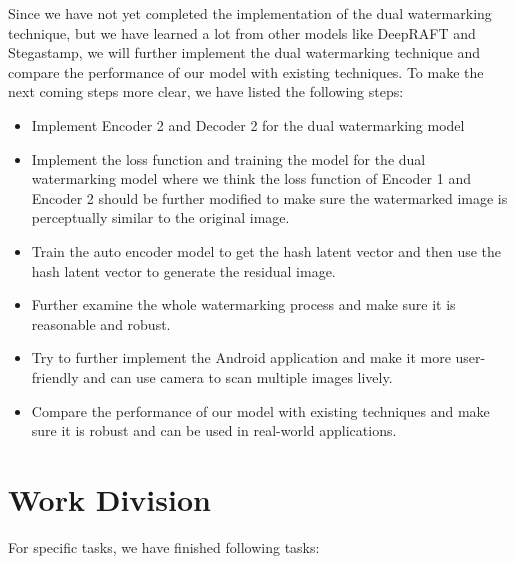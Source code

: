 \documentclass[acmsmall, nonacm]{acmart}
\begin{document}

Since we have not yet completed the implementation of the dual watermarking technique, but we have learned a lot from other models like DeepRAFT and Stegastamp, we will further implement the dual watermarking technique and compare the performance of our model with existing techniques.
To make the next coming steps more clear, we have listed the following steps:

\begin{itemize}
  \item Implement Encoder 2 and Decoder 2 for the dual watermarking model
  \item Implement the loss function and training the model for the dual watermarking model where we think the loss function of Encoder 1 and Encoder 2 should be further modified to make sure the watermarked image is perceptually similar to the original image.
  \item Train the auto encoder model to get the hash latent vector and then use the hash latent vector to generate the residual image.
  \item Further examine the whole watermarking process and make sure it is reasonable and robust.
  \item Try to further implement the Android application and make it more user-friendly and can use camera to scan multiple images lively.
  \item Compare the performance of our model with existing techniques and make sure it is robust and can be used in real-world applications.
\end{itemize}

\section{Work Division}\label{sec:work-division}




For specific tasks, we have finished following tasks:
\end{document}
